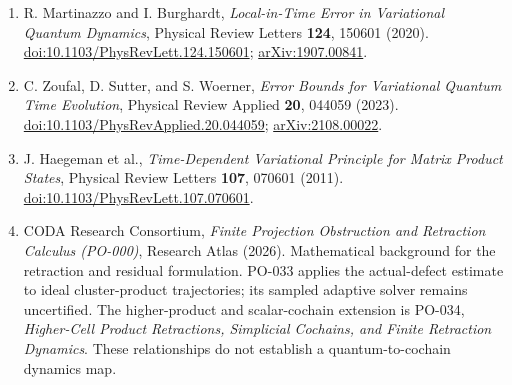 \documentclass[
]{article}
\providecommand{\tightlist}{%
  \setlength{\itemsep}{0pt}\setlength{\parskip}{0pt}}
\providecommand{\tightlist}{%
  \setlength{\itemsep}{0pt}\setlength{\parskip}{0pt}}
\begin{document}
\begin{enumerate}
\def\labelenumi{\arabic{enumi}.}
\tightlist
\item
  R. Martinazzo and I. Burghardt, \emph{Local-in-Time Error in Variational Quantum Dynamics}, Physical Review Letters \textbf{124}, 150601 (2020). \href{https://doi.org/10.1103/PhysRevLett.124.150601}{doi:10.1103/PhysRevLett.124.150601}; \href{https://arxiv.org/abs/1907.00841}{arXiv:1907.00841}.
\item
  C. Zoufal, D. Sutter, and S. Woerner, \emph{Error Bounds for Variational Quantum Time Evolution}, Physical Review Applied \textbf{20}, 044059 (2023). \href{https://doi.org/10.1103/PhysRevApplied.20.044059}{doi:10.1103/PhysRevApplied.20.044059}; \href{https://arxiv.org/abs/2108.00022}{arXiv:2108.00022}.
\item
  J. Haegeman et al., \emph{Time-Dependent Variational Principle for Matrix Product States}, Physical Review Letters \textbf{107}, 070601 (2011). \href{https://doi.org/10.1103/PhysRevLett.107.070601}{doi:10.1103/PhysRevLett.107.070601}.
\item
  CODA Research Consortium, \emph{Finite Projection Obstruction and Retraction Calculus (PO-000)}, Research Atlas (2026). Mathematical background for the retraction and residual formulation. PO-033 applies the actual-defect estimate to ideal cluster-product trajectories; its sampled adaptive solver remains uncertified. The higher-product and scalar-cochain extension is PO-034, \emph{Higher-Cell Product Retractions, Simplicial Cochains, and Finite Retraction Dynamics}. These relationships do not establish a quantum-to-cochain dynamics map.
\end{enumerate}
\end{document}
